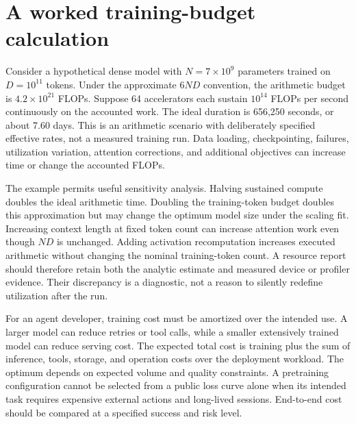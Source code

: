 \section{A worked training-budget calculation}
\label{sec:C07:budget}
Consider a hypothetical dense model with $N=7\times10^9$ parameters trained on $D=10^{11}$ tokens. Under the approximate $6ND$ convention, the arithmetic budget is $4.2\times10^{21}$ FLOPs. Suppose 64 accelerators each sustain $10^{14}$ FLOPs per second continuously on the accounted work. The ideal duration is 656,250 seconds, or about 7.60 days. This is an arithmetic scenario with deliberately specified effective rates, not a measured training run. Data loading, checkpointing, failures, utilization variation, attention corrections, and additional objectives can increase time or change the accounted FLOPs.

The example permits useful sensitivity analysis. Halving sustained compute doubles the ideal arithmetic time. Doubling the training-token budget doubles this approximation but may change the optimum model size under the scaling fit. Increasing context length at fixed token count can increase attention work even though $ND$ is unchanged. Adding activation recomputation increases executed arithmetic without changing the nominal training-token count. A resource report should therefore retain both the analytic estimate and measured device or profiler evidence. Their discrepancy is a diagnostic, not a reason to silently redefine utilization after the run.

For an agent developer, training cost must be amortized over the intended use. A larger model can reduce retries or tool calls, while a smaller extensively trained model can reduce serving cost. The expected total cost is training plus the sum of inference, tools, storage, and operation costs over the deployment workload. The optimum depends on expected volume and quality constraints. A pretraining configuration cannot be selected from a public loss curve alone when its intended task requires expensive external actions and long-lived sessions. End-to-end cost should be compared at a specified success and risk level.

